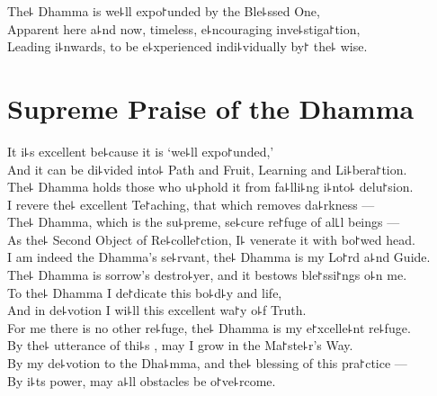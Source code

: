 \begin{leader}
\end{leader}

The꜕ Dhamma is we꜕ll expo꜓unded by the Ble꜕ssed One,\\
Apparent here a꜕nd now, timeless, e꜕ncouraging inve꜕stiga꜓tion,\\
Leading i꜕nwards, to be e꜕xperienced indi꜕vidually by꜓ the꜕ wise.

\nextChapterUseDelegatedPageNumber

\chapter{Supreme Praise of the Dhamma}

\begin{leader}
\end{leader}

It i꜕s excellent be꜕cause it is `we꜕ll expo꜓unded,'\\
And it can be di꜕vided into꜕ Path and Fruit, Learning and Li꜕bera꜓tion.\\
The꜕ Dhamma holds those who u꜕phold it from fa꜕lli꜕ng i꜕nto꜕ delu꜓sion.\\
I revere the꜕ excellent Te꜓aching, that which removes da꜕rkness ---\\
The꜕ Dhamma, which is the su꜕preme, se꜕cure re꜓fuge of al꜖l beings ---\\
As the꜕ Second Object of Re꜕colle꜓ction, I꜕ venerate it with bo꜓wed head.\\
I am indeed the Dhamma's se꜕rvant, the꜕ Dhamma is my Lo꜓rd a꜕nd Guide.\\
The꜕ Dhamma is sorrow's destro꜕yer, and it bestows ble꜓ssi꜓ngs o꜕n me.\\
To the꜕ Dhamma I de꜓dicate this bo꜕d꜕y and life,\\
And in de꜕votion I wi꜕ll  this excellent wa꜓y o꜕f Truth.\\
For me there is no other re꜕fuge, the꜕ Dhamma is my e꜓xcelle꜕nt re꜕fuge.\\
By the꜕ utterance of thi꜕s , may I grow in the Ma꜓ste꜕r's Way.\\
By my de꜕votion to the Dha꜕mma, and the꜕ blessing of this pra꜓ctice ---\\
By i꜕ts power, may a꜕ll obstacles be o꜓ve꜕rcome.

\clearpage

